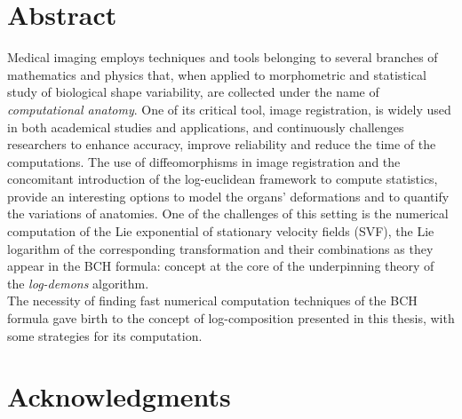 
\qquad
\pagestyle{empty}
\newpage


\section*{Abstract}

Medical imaging employs techniques and tools belonging to several branches of mathematics and physics that, when applied to morphometric and statistical study of biological shape variability, are collected under the name of \emph{computational anatomy}. 
One of its critical tool, image registration, is widely used in both academical studies and applications, and continuously challenges researchers to enhance accuracy, improve reliability and reduce the time of the computations. The use of diffeomorphisms in image registration and the concomitant introduction of the log-euclidean framework to compute statistics, provide an interesting options to model the organs' deformations and to quantify the variations of anatomies.
One of the challenges of this setting is the numerical computation of the Lie exponential of stationary velocity fields (SVF), the Lie logarithm of the corresponding transformation and their combinations as they appear in the BCH formula: concept at the core of the underpinning theory of the \emph{log-demons} algorithm.\\
The necessity of finding fast numerical computation techniques of the BCH formula gave birth to the concept of log-composition presented in this thesis, with some strategies for its computation.

\vspace{0.5cm}
\section*{Acknowledgments}

